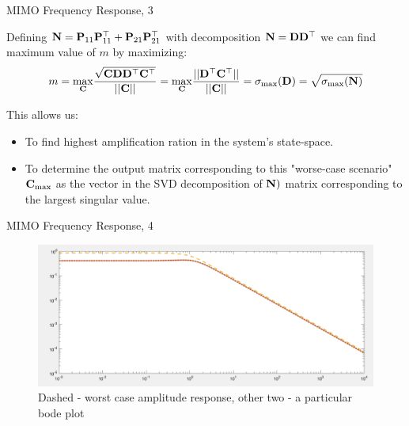\documentclass{beamer}
\begin{document}
\begin{frame}{MIMO Frequency Response, 3}
	\begin{flushleft}
		
		Defining $\mathbf{N} = \mathbf{P} _{11} \mathbf{P} _{11}^\top +\mathbf{P} _{21} \mathbf{P} _{21}^\top$ with decomposition $\mathbf{N} = \mathbf{D} \mathbf{D}^\top$ we can find maximum value of $m$ by maximizing:
		\begin{align*}
			m = \underset{\mathbf{C}}{\max } \frac{\sqrt{\mathbf{C} \mathbf{D} \mathbf{D}^\top \mathbf{C}^\top}}{|| \mathbf{C}||}
			=
			\underset{\mathbf{C}}{\max } \frac{||\mathbf{D}^\top \mathbf{C}^\top||}{|| \mathbf{C}||} = \sigma_{\max}(\mathbf{D}) =\sqrt{ \sigma_{\max}(\mathbf{N})}
		\end{align*}		
		
		This allows us:
		
		\begin{itemize}
			\item To find highest amplification ration in the system's state-space.
			
			\item To determine the output matrix corresponding to this "worse-case scenario"  $\mathbf{C}_{\max}$ as the vector in the SVD decomposition of $\mathbf{N})$ matrix corresponding to the largest singular value.
		\end{itemize}
		
	\end{flushleft}
\end{frame}



\begin{frame}{MIMO Frequency Response, 4}
	\begin{flushleft}
		
		\begin{figure}
			\centering
			\includegraphics[width=1 \linewidth]{WorstCaseAmp}
			\caption{Dashed - worst case amplitude response, other two - a particular bode plot}
			\label{fig:worstcaseamp}
		\end{figure}
		
		
	\end{flushleft}
\end{frame}


\myqrframe
\end{document}
